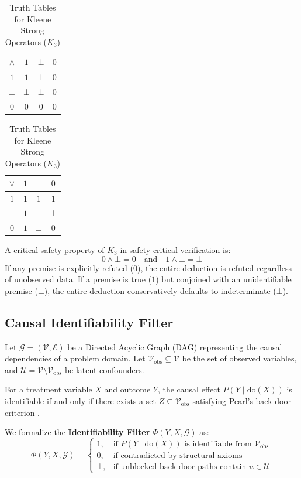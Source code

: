 \documentclass[conference]{IEEEtran}
\begin{document}
\begin{table}[htbp]
\caption{Truth Tables for Kleene Strong Operators ($K_3$)}
\begin{center}
\begin{tabular}{c|ccc}
\toprule
$\land$ & $1$ & $\bot$ & $0$ \\
\midrule
$1$ & $1$ & $\bot$ & $0$ \\
$\bot$ & $\bot$ & $\bot$ & $0$ \\
$0$ & $0$ & $0$ & $0$ \\
\bottomrule
\end{tabular}
\quad
\begin{tabular}{c|ccc}
\toprule
$\lor$ & $1$ & $\bot$ & $0$ \\
\midrule
$1$ & $1$ & $1$ & $1$ \\
$\bot$ & $1$ & $\bot$ & $\bot$ \\
$0$ & $1$ & $\bot$ & $0$ \\
\bottomrule
\end{tabular}
\end{center}
\end{table}

A critical safety property of $K_3$ in safety-critical verification is:
\begin{equation}
0 \land \bot = 0 \quad \text{and} \quad 1 \land \bot = \bot
\end{equation}
If any premise is explicitly refuted ($0$), the entire deduction is refuted regardless of unobserved data. If a premise is true ($1$) but conjoined with an unidentifiable premise ($\bot$), the entire deduction conservatively defaults to indeterminate ($\bot$).

\subsection{Causal Identifiability Filter}
Let $\mathcal{G} = (\mathcal{V}, \mathcal{E})$ be a Directed Acyclic Graph (DAG) representing the causal dependencies of a problem domain. Let $\mathcal{V}_{\text{obs}} \subseteq \mathcal{V}$ be the set of observed variables, and $\mathcal{U} = \mathcal{V} \setminus \mathcal{V}_{\text{obs}}$ be latent confounders.

For a treatment variable $X$ and outcome $Y$, the causal effect $P(Y \mid \text{do}(X))$ is identifiable if and only if there exists a set $Z \subseteq \mathcal{V}_{\text{obs}}$ satisfying Pearl's back-door criterion \cite{pearl2009causality}.

We formalize the \textbf{Identifiability Filter} $\Phi(Y, X, \mathcal{G})$ as:
\begin{equation}
\Phi(Y, X, \mathcal{G}) = 
\begin{cases}
1, & \text{if } P(Y \mid \text{do}(X)) \text{ is identifiable from } \mathcal{V}_{\text{obs}} \\
0, & \text{if contradicted by structural axioms} \\
\bot, & \text{if unblocked back-door paths contain } u \in \mathcal{U}
\end{cases}
\end{equation}
\end{document}
